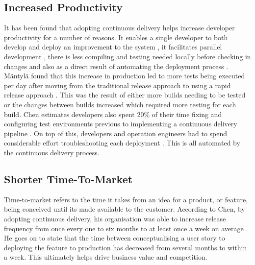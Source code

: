 \documentclass[10pt,journal,compsoc]{IEEEtran}
\begin{document}
\subsection{Increased Productivity}
It has been found that adopting continuous delivery helps increase developer productivity for a number of reasons. It enables a single developer to both develop and deploy an improvement to the system \cite{mantyla2015rapid}, it facilitates parallel development \cite{staahl2013experienced}, there is less compiling and testing needed locally before checking in changes and also as a direct result of automating the deployment process \cite{RODRIGUEZ2017263}. M{\"a}ntyl{\"a} found that this increase in production led to more tests being executed per day after moving from the traditional release approach to using a rapid release approach \cite{mantyla2015rapid}. This was the result of either more builds needing to be tested or the changes between builds increased which required more testing for each build. Chen estimates developers also spent 20\% of their time fixing and configuring test environments previous to implementing a continuous delivery pipeline \cite{chen2015continuous}. On top of this, developers and operation engineers had to spend considerable effort troubleshooting each deployment \cite{chen2015continuous}. This is all automated by the continuous delivery process.

\subsection{Shorter Time-To-Market}
Time-to-market refers to the time it takes from an idea for a product, or feature, being conceived until its made available to the customer. According to Chen, by adopting continuous delivery, his organisation was able to increase release frequency from once every one to six months to at least once a week on average \cite{chen2015continuous}. He goes on to state that the time between conceptualising a user story to deploying the feature to production has decreased from several months to within a week. This ultimately helps drive business value and competition.
\end{document}
